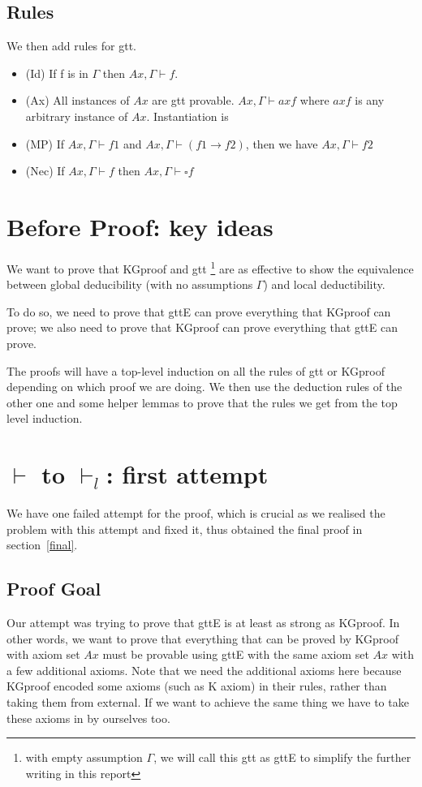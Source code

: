 \documentclass[submission,copyright,creativecommons]{eptcs}
\begin{document}
\subsection{Rules}
We then add rules for gtt. 
\begin{itemize}
 \item (Id) If f is in $\Gamma$ then $Ax, \Gamma \vdash f$. 
 \item (Ax) All instances of $Ax$ are gtt provable. $Ax, \Gamma \vdash axf$ where $axf$ is 
 any arbitrary instance of $Ax$. Instantiation is 
 \item (MP) If $Ax, \Gamma \vdash f1$ and $Ax, \Gamma \vdash (f1 \rightarrow f2)$, then 
 we have $Ax, \Gamma \vdash f2$
 \item (Nec) If $Ax, \Gamma \vdash f$ then $Ax, \Gamma \vdash \square f$ 
\end{itemize}

\section{Before Proof: key ideas}
We want to prove that KGproof and gtt \footnote{with empty assumption $\Gamma$, 
we will call this gtt as gttE to simplify the further writing in this report}
 are as effective 
to show the equivalence between global deducibility (with no assumptions $\Gamma$) and local deductibility. 

To do so, we need to prove that gttE
can prove everything that KGproof can prove; 
we also need to prove that KGproof can prove everything that gttE can prove.

The proofs will have a top-level induction on all the rules of gtt or KGproof depending on which 
proof we are doing. We then use the deduction rules of the other one and some helper lemmas 
to prove that the rules we get from the top level induction.

\section{$\vdash$ to $\vdash_l$: first attempt}
We have one failed attempt for the proof, which is crucial as we 
realised the problem with this attempt and fixed it, thus obtained the final proof 
in section~\ref{final}.


\subsection{Proof Goal}

Our attempt was trying to prove that gttE is at least as strong as KGproof.
In other words, we want to prove that everything that can be proved by KGproof with axiom set $Ax$
must be provable using gttE with the same axiom set $Ax$ with a few additional axioms.
Note that we need the additional axioms here because KGproof encoded some axioms (such as K axiom) 
in their rules, rather than taking them from external. If we want to achieve the same 
thing we have to take these axioms in by ourselves too. 
\end{document}
